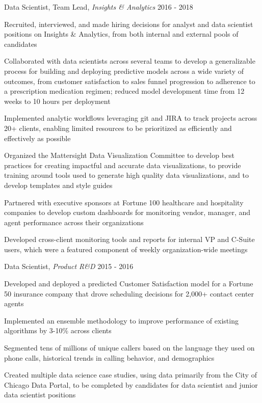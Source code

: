 \begin{cventries}
  \cventry
    {Data Scientist, Team Lead, \textit{Insights \& Analytics}} %
    {} %
    {} %
    {2016 - 2018} %
    {
      \begin{cvitems}
        \item {Recruited, interviewed, and made hiring decisions for analyst and data scientist positions on Insights \& Analytics, from both internal and external pools of candidates}
        \item {Collaborated with data scientists across several teams to develop a generalizable process for building and deploying predictive models across a wide variety of outcomes, from customer satisfaction to sales funnel progression to adherence to a prescription medication regimen; reduced model development time from 12 weeks to 10 hours per deployment}
        \item {Implemented analytic workflows leveraging git and JIRA to track projects across 20+ clients, enabling limited resources to be prioritized as efficiently and effectively as possible}
        \item {Organized the Mattersight Data Visualization Committee to develop best practices for creating impactful and accurate data visualizations, to provide training around tools used to generate high quality data visualizations, and to develop templates and style guides}
        \item{Partnered with executive sponsors at Fortune 100 healthcare and hospitality companies to develop custom dashboards for monitoring vendor, manager, and agent performance across their organizations}
        \item{Developed cross-client monitoring tools and reports for internal VP and C-Suite users, which were a featured component of weekly organization-wide meetings}
      \end{cvitems}
    }

  \cventry
    {Data Scientist, \textit{Product R\&D}} %
    {} %
    {} %
    {2015 - 2016} %
    {
      \begin{cvitems} %
        \item {Developed and deployed a predicted Customer Satisfaction model for a Fortune 50 insurance company that drove scheduling decisions for 2,000+ contact center agents}
        \item {Implemented an ensemble methodology to improve performance of existing algorithms by 3-10\% across clients}
        \item {Segmented tens of millions of unique callers based on the language they used on phone calls, historical trends in calling behavior, and demographics}
        \item {Created multiple data science case studies, using data primarily from the City of Chicago Data Portal, to be completed by candidates for data scientist and junior data scientist positions}
      \end{cvitems}
    }


\end{cventries}
